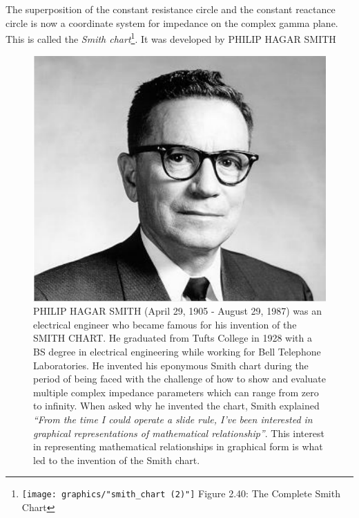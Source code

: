\section{}
The superposition of the constant resistance circle and the constant reactance circle is now a coordinate system for impedance on the complex gamma plane. This is called the \emph{Smith chart}\footnote{
\centering
\texttt{[image: graphics/"smith\_chart (2)"]}
\centering
Figure 2.40: The Complete Smith Chart
}. It was developed by PHILIP HAGAR SMITH
\begin{figure}[h]
\includegraphics[scale=0.09]{graphics/a21}
PHILIP HAGAR SMITH (April 29, 1905 - August 29, 1987) was an electrical engineer who became famous for his invention of the SMITH CHART. He graduated from Tufts College in 1928 with a BS degree in electrical engineering while working for Bell Telephone Laboratories. He invented his eponymous Smith chart during the period of being faced with the challenge of how to show and evaluate multiple complex impedance parameters which can range from zero to infinity. When asked why he invented the chart, Smith explained \emph{\textquotedblleft From the time I could operate a slide rule, I've been interested in graphical representations of mathematical relationship\textquotedblright}. This interest in representing mathematical relationships in graphical form is what led to the invention of the Smith chart.
\label{fig:smithchart-2}
\end{figure}

